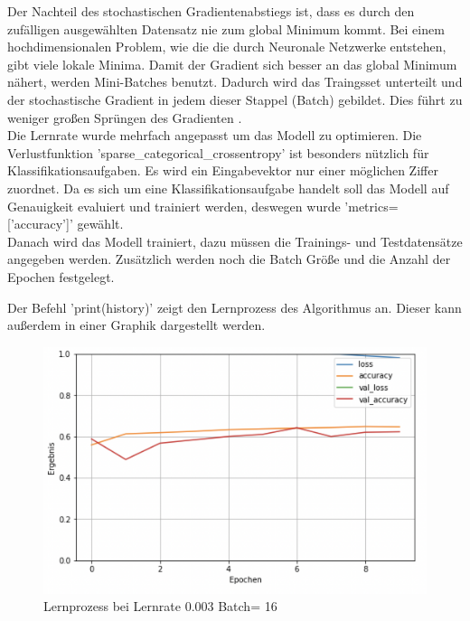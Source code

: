 Der Nachteil des stochastischen Gradientenabstiegs  ist,  dass es durch den zufälligen ausgewählten Datensatz nie zum global Minimum kommt.  Bei einem hochdimensionalen Problem, wie die die durch Neuronale Netzwerke entstehen, gibt viele lokale Minima. Damit der Gradient sich besser an das  global Minimum nähert, werden Mini-Batches benutzt. Dadurch wird das Traingsset unterteilt und der stochastische Gradient in jedem dieser Stappel (Batch) gebildet. Dies führt zu weniger großen Sprüngen des Gradienten \cite{Geron2019}. \\
Die Lernrate wurde mehrfach angepasst um das Modell zu optimieren.  Die Verlustfunktion 'sparse\_categorical\_crossentropy' ist besonders nützlich für Klassifikationsaufgaben.  Es wird ein Eingabevektor nur einer möglichen Ziffer zuordnet.  Da es sich um eine Klassifikationsaufgabe handelt soll das Modell auf Genauigkeit evaluiert und trainiert werden, deswegen wurde 'metrics=['accuracy']' gewählt. \\
Danach wird das Modell trainiert, dazu müssen die Trainings- und Testdatensätze angegeben werden. Zusätzlich werden noch die Batch Größe und die Anzahl der Epochen festgelegt.


Der Befehl 'print(history)' zeigt den Lernprozess des Algorithmus an.  Dieser kann außerdem in einer Graphik dargestellt werden.
\begin{figure}[h]
\centering
\includegraphics[scale=0.5]{pic/label000316}
\caption{Lernprozess bei Lernrate 0.003 Batch= 16}
\end{figure}
